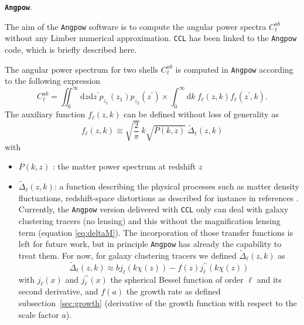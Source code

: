 \documentclass[\docopts]{\docclass}
\newcommand{\ccl}{{\tt CCL}\xspace}
\begin{document}
{\texttt{\bf Angpow}.}

The aim of the \texttt{Angpow} software \citep{2017arXiv170103592C} is to compute the angular power spectra  $C_{\ell}^{ab}$  without any Limber numerical approximation. \ccl has been linked to the \texttt{Angpow} code,  which is briefly described here.

The angular power spectrum for two shells $C_{\ell}^{ab}$ is computed in \texttt{Angpow} according to the following expression
\begin{equation}
  C_{\ell}^{ab} = \iint_0^\infty \mathrm{d} z \mathrm{d} z^\prime  p_{z_1}(z_1) p_{z_2}(z^\prime) \times \int_0^\infty \mathrm{d} k\ f_{\ell}(z, k) f_{\ell}(z^\prime, k).
  \label{eq-clz1z2-obs}
\end{equation}
The auxiliary function $f_\ell(z,k)$ can be defined without loss of generality as
\begin{equation}
f_\ell(z,k) \equiv  \sqrt{\frac{2}{\pi}}\  k \sqrt{P(k,z)}\ \widetilde{\Delta}_\ell(z,k)\label{eq-fell-func}
\end{equation}
with
\begin{itemize}
\item  $P(k,z)$ : the matter power spectrum at redshift $z$
\item $\widetilde{\Delta}_\ell(z,k)$: a function describing the physical processes such as matter density fluctuations, redshift-space distortions as described for instance in references \citet{2008cmb..book.....D,2009PhRvD..80h3514Y,2010PhRvD..82h3508Y, 2011PhRvD..84d3516C,2011PhRvD..84f3505B}. Currently, the \texttt{Angpow} version delivered with \ccl only can deal with galaxy clustering tracers (no lensing) and this without the magnification lensing term (equation \ref{eq:deltaM}). The incorporation of those transfer functions is left for future work, but in principle \texttt{Angpow} has already the capability to treat them. For now, for galaxy clustering tracers we defined $\widetilde{\Delta}_\ell(z,k)$ as
\begin{equation}
 \widetilde{\Delta}_\ell(z,k) \approx b j_\ell(k \chi(z)) - f(z) j_\ell^{\prime\prime}(k \chi(z))
\end{equation}
with $j_\ell(x)$ and $j_\ell^{\prime\prime}(x)$ the spherical Bessel function of order $\ell$ and its second derivative, and $f(a)$ the growth rate as defined subsection~\ref{sec:growth} (derivative of the growth function with respect to the scale factor $a$).
\end{itemize}
\end{document}
